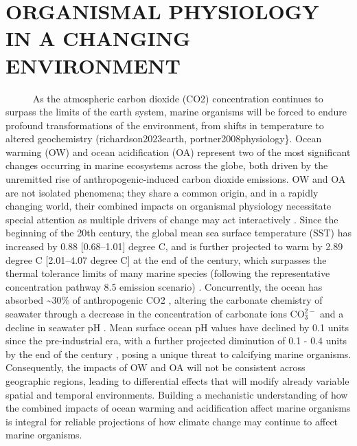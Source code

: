 \documentclass[
]{article}
\begin{document}
\hypertarget{organismal-physiology-in-a-changing-environment}{%
\section{ORGANISMAL PHYSIOLOGY IN A CHANGING
ENVIRONMENT}\label{organismal-physiology-in-a-changing-environment}}

~~~~~ As the atmospheric carbon dioxide (CO2) concentration continues to
surpass the limits of the earth system, marine organisms will be forced
to endure profound transformations of the environment, from shifts in
temperature to altered geochemistry (richardson2023earth,
portner2008physiology\}. Ocean warming (OW) and ocean acidification (OA)
represent two of the most significant changes occurring in marine
ecosystems across the globe, both driven by the unremitted rise of
anthropogenic-induced carbon dioxide emissions. OW and OA are not
isolated phenomena; they share a common origin, and in a rapidly
changing world, their combined impacts on organismal physiology
necessitate special attention as multiple drivers of change may act
interactively \citep{cote2016interactions}. Since the beginning of the
20th century, the global mean sea surface temperature (SST) has
increased by 0.88 {[}0.68--1.01{]} degree C, and is further projected to
warm by 2.89 degree C {[}2.01--4.07 degree C{]} at the end of the
century, which surpasses the thermal tolerance limits of many marine
species (following the representative concentration pathway 8.5 emission
scenario)
\citep{kikstra2022ipcc, fox2021ocean, bay2017genomic, somero2010physiology}.
Concurrently, the ocean has absorbed \textasciitilde30\% of
anthropogenic CO2 \citep{feely2004impact}, altering the carbonate
chemistry of seawater through a decrease in the concentration of
carbonate ions \(\mathrm{CO_3^{2-}}\) and a decline in seawater pH
\citep{feely2004impact}. Mean surface ocean pH values have declined by
0.1 units since the pre-industrial era, with a further projected
diminution of 0.1 - 0.4 units by the end of the century
\citep{change2014impacts, orr2005anthropogenic}, posing a unique threat
to calcifying marine organisms. Consequently, the impacts of OW and OA
will not be consistent across geographic regions, leading to
differential effects that will modify already variable spatial and
temporal environments. Building a mechanistic understanding of how the
combined impacts of ocean warming and acidification affect marine
organisms is integral for reliable projections of how climate change may
continue to affect marine organisms.
\end{document}
